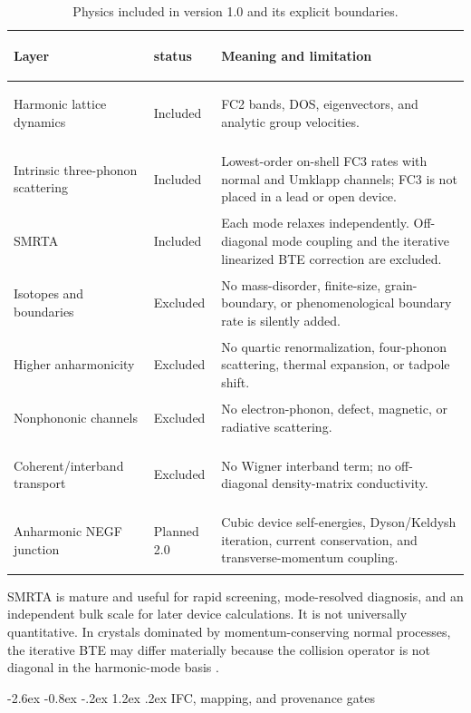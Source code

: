 \documentclass[11pt,a4paper]{article}
\makeatletter
\renewcommand\section{\@startsection{section}{1}{\z@}%
  {-2.6ex \@plus -0.8ex \@minus -.2ex}%
  {1.2ex \@plus .2ex}%
  {\normalfont\Large\sffamily\bfseries\color{ink}}}
\makeatother
\begin{document}
\begin{table}[htbp]
\centering
\caption{Physics included in version 1.0 and its explicit boundaries.}
\small
\begin{tabularx}{\textwidth}{>{\bfseries\raggedright\arraybackslash}p{} >{\raggedright\arraybackslash}p{} >{\raggedright\arraybackslash}X}
\toprule
Layer & 1.0 status & Meaning and limitation \\
\midrule
Harmonic lattice dynamics & Included & FC2 bands, DOS, eigenvectors, and analytic group velocities. \\
Intrinsic three-phonon scattering & Included & Lowest-order on-shell FC3 rates with normal and Umklapp channels; FC3 is not placed in a lead or open device. \\
SMRTA & Included & Each mode relaxes independently. Off-diagonal mode coupling and the iterative linearized BTE correction are excluded. \\
Isotopes and boundaries & Excluded & No mass-disorder, finite-size, grain-boundary, or phenomenological boundary rate is silently added. \\
Higher anharmonicity & Excluded & No quartic renormalization, four-phonon scattering, thermal expansion, or tadpole shift. \\
Nonphononic channels & Excluded & No electron-phonon, defect, magnetic, or radiative scattering. \\
Coherent/interband transport & Excluded & No Wigner interband term; no off-diagonal density-matrix conductivity. \\
Anharmonic NEGF junction & Planned 2.0 & Cubic device self-energies, Dyson/Keldysh iteration, current conservation, and transverse-momentum coupling. \\
\bottomrule
\end{tabularx}
\end{table}

SMRTA is mature and useful for rapid screening, mode-resolved diagnosis, and
an independent bulk scale for later device calculations. It is not universally
quantitative. In crystals dominated by momentum-conserving normal processes,
the iterative BTE may differ materially because the collision operator is not
diagonal in the harmonic-mode basis \cite{ziman1960,togo2015}.

\section{IFC, mapping, and provenance gates}
\end{document}
